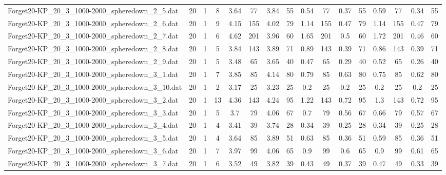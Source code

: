 \begin{sidewaystable}[!ht]
{\begin{tabular}{lccccccccccccccc}
Forget20-KP\_20\_3\_1000-2000\_spheredown\_2\_5.dat & 20 & 1 & 8 & 3.64 & 77 & 3.84 & 55 & 0.54 & 77 & 0.37 & 55 & 0.59 & 77 &  \textcolor{blue2}{0.34} & 55 \\
Forget20-KP\_20\_3\_1000-2000\_spheredown\_2\_6.dat & 20 & 1 & 9 & 4.15 & 155 & 4.02 & 79 & 1.14 & 155 &  \textcolor{blue2}{0.47} & 79 & 1.14 & 155 &  \textcolor{blue2}{0.47} & 79 \\
Forget20-KP\_20\_3\_1000-2000\_spheredown\_2\_7.dat & 20 & 1 & 6 & 4.62 & 201 & 3.96 & 60 & 1.65 & 201 & 0.5 & 60 & 1.72 & 201 &  \textcolor{blue2}{0.46} & 60 \\
Forget20-KP\_20\_3\_1000-2000\_spheredown\_2\_8.dat & 20 & 1 & 5 & 3.84 & 143 & 3.89 & 71 & 0.89 & 143 & 0.39 & 71 & 0.86 & 143 & 0.39 & 71 \\
Forget20-KP\_20\_3\_1000-2000\_spheredown\_2\_9.dat & 20 & 1 & 5 & 3.48 & 65 & 3.65 & 40 & 0.47 & 65 & 0.29 & 40 & 0.52 & 65 &  \textcolor{blue2}{0.26} & 40 \\
Forget20-KP\_20\_3\_1000-2000\_spheredown\_3\_1.dat & 20 & 1 & 7 & 3.85 & 85 & 4.14 & 80 & 0.79 & 85 & 0.63 & 80 & 0.75 & 85 &  \textcolor{blue2}{0.62} & 80 \\
Forget20-KP\_20\_3\_1000-2000\_spheredown\_3\_10.dat & 20 & 1 & 2 & 3.17 & 25 & 3.23 & 25 &  \textcolor{blue2}{0.2} & 25 &  \textcolor{blue2}{0.2} & 25 &  \textcolor{blue2}{0.2} & 25 &  \textcolor{blue2}{0.2} & 25 \\
Forget20-KP\_20\_3\_1000-2000\_spheredown\_3\_2.dat & 20 & 1 & 13 & 4.36 & 143 & 4.24 & 95 & 1.22 & 143 &  \textcolor{blue2}{0.72} & 95 & 1.3 & 143 &  \textcolor{blue2}{0.72} & 95 \\
Forget20-KP\_20\_3\_1000-2000\_spheredown\_3\_3.dat & 20 & 1 & 5 & 3.7 & 79 & 4.06 & 67 & 0.7 & 79 &  \textcolor{blue2}{0.56} & 67 & 0.66 & 79 & 0.57 & 67 \\
Forget20-KP\_20\_3\_1000-2000\_spheredown\_3\_4.dat & 20 & 1 & 4 & 3.41 & 39 & 3.74 & 28 & 0.34 & 39 &  \textcolor{blue2}{0.25} & 28 & 0.34 & 39 &  \textcolor{blue2}{0.25} & 28 \\
Forget20-KP\_20\_3\_1000-2000\_spheredown\_3\_5.dat & 20 & 1 & 4 & 3.64 & 85 & 3.89 & 51 & 0.63 & 85 &  \textcolor{blue2}{0.36} & 51 & 0.59 & 85 &  \textcolor{blue2}{0.36} & 51 \\
Forget20-KP\_20\_3\_1000-2000\_spheredown\_3\_6.dat & 20 & 1 & 7 & 3.97 & 99 & 4.06 & 65 & 0.9 & 99 &  \textcolor{blue2}{0.6} & 65 & 0.9 & 99 & 0.61 & 65 \\
Forget20-KP\_20\_3\_1000-2000\_spheredown\_3\_7.dat & 20 & 1 & 6 & 3.52 & 49 & 3.82 & 39 & 0.43 & 49 & 0.37 & 39 & 0.47 & 49 &  \textcolor{blue2}{0.33} & 39 \\

\end{tabular}}
\end{sidewaystable}
